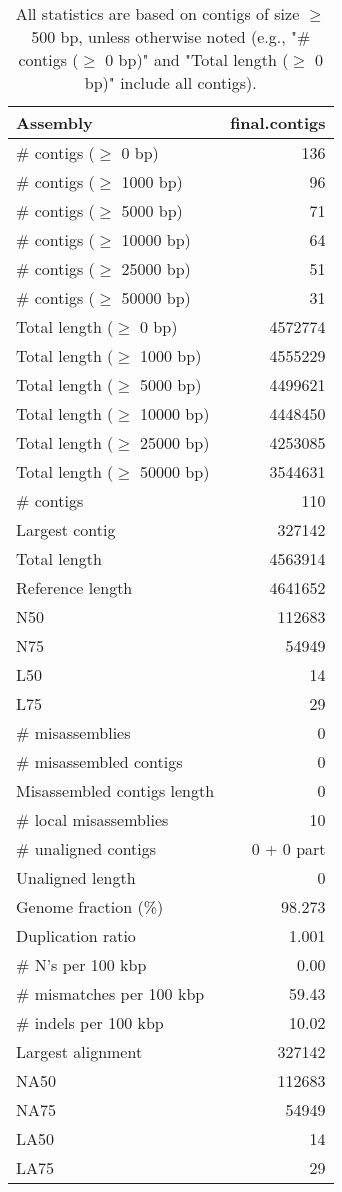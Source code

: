 \documentclass[12pt,a4paper]{article}
\begin{document}
\begin{table}[ht]
\begin{center}
\caption{All statistics are based on contigs of size $\geq$ 500 bp, unless otherwise noted (e.g., "\# contigs ($\geq$ 0 bp)" and "Total length ($\geq$ 0 bp)" include all contigs).}
\begin{tabular}{|l*{1}{|r}|}
\hline
Assembly & final.contigs \\ \hline
\# contigs ($\geq$ 0 bp) & 136 \\ \hline
\# contigs ($\geq$ 1000 bp) & 96 \\ \hline
\# contigs ($\geq$ 5000 bp) & 71 \\ \hline
\# contigs ($\geq$ 10000 bp) & 64 \\ \hline
\# contigs ($\geq$ 25000 bp) & 51 \\ \hline
\# contigs ($\geq$ 50000 bp) & 31 \\ \hline
Total length ($\geq$ 0 bp) & 4572774 \\ \hline
Total length ($\geq$ 1000 bp) & 4555229 \\ \hline
Total length ($\geq$ 5000 bp) & 4499621 \\ \hline
Total length ($\geq$ 10000 bp) & 4448450 \\ \hline
Total length ($\geq$ 25000 bp) & 4253085 \\ \hline
Total length ($\geq$ 50000 bp) & 3544631 \\ \hline
\# contigs & 110 \\ \hline
Largest contig & 327142 \\ \hline
Total length & 4563914 \\ \hline
Reference length & 4641652 \\ \hline
N50 & 112683 \\ \hline
N75 & 54949 \\ \hline
L50 & 14 \\ \hline
L75 & 29 \\ \hline
\# misassemblies & 0 \\ \hline
\# misassembled contigs & 0 \\ \hline
Misassembled contigs length & 0 \\ \hline
\# local misassemblies & 10 \\ \hline
\# unaligned contigs & 0 + 0 part \\ \hline
Unaligned length & 0 \\ \hline
Genome fraction (\%) & 98.273 \\ \hline
Duplication ratio & 1.001 \\ \hline
\# N's per 100 kbp & 0.00 \\ \hline
\# mismatches per 100 kbp & 59.43 \\ \hline
\# indels per 100 kbp & 10.02 \\ \hline
Largest alignment & 327142 \\ \hline
NA50 & 112683 \\ \hline
NA75 & 54949 \\ \hline
LA50 & 14 \\ \hline
LA75 & 29 \\ \hline
\end{tabular}
\end{center}
\end{table}
\end{document}
